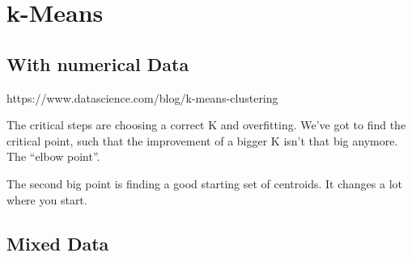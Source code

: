 \documentclass{article}
\begin{document}
\section{k-Means}
\subsection{With numerical Data}
https://www.datascience.com/blog/k-means-clustering

The critical steps are choosing a correct K and overfitting. We've got to find
the critical point, such that the improvement of a bigger K isn't that big
anymore. The ``elbow point''.

The second big point is finding a good starting set of centroids. It changes a
lot where you start. 

\subsection{Mixed Data}







\end{document}
